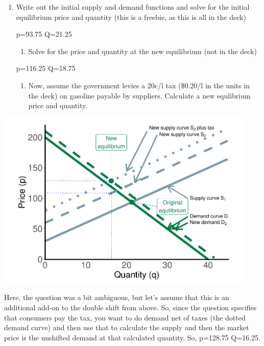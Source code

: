 \documentclass[11pt,]{article}
\providecommand{\tightlist}{%
  \setlength{\itemsep}{0pt}\setlength{\parskip}{0pt}}
\begin{document}
\begin{enumerate}
\def\labelenumi{\alph{enumi})}
\item
  Write out the initial supply and demand functions and solve for the
  initial equilibrium price and quantity (this is a freebie, as this is
  all in the deck)

  p=93.75 Q=21.25

  \begin{enumerate}
  \def\labelenumii{\alph{enumii})}
  \setcounter{enumii}{1}
  \tightlist
  \item
    Solve for the price and quantity at the new equilibrium (not in the
    deck)
  \end{enumerate}

  p=116.25 Q=18.75

  \begin{enumerate}
  \def\labelenumii{\alph{enumii})}
  \setcounter{enumii}{2}
  \tightlist
  \item
    Now, assume the government levies a 20c/l tax (\$0.20/l in the units
    in the deck) on gasoline payable by suppliers. Calculate a new
    equlibrium price and quantity.
  \end{enumerate}
\end{enumerate}

\begin{center}\includegraphics[width=468px]{week_3_problems_soln_files/figure-latex/q_3d_graphs-1} \end{center}

Here, the question was a bit ambiguous, but let's assume that this is an
additional add-on to the double shift from above. So, since the question
specifies that consumers pay the tax, you want to do demand net of taxes
(the dotted demand curve) and then use that to calculate the supply and
then the market price is the unshifted demand at that calculated
quantity. So, p=128.75 Q=16.25.
\end{document}
